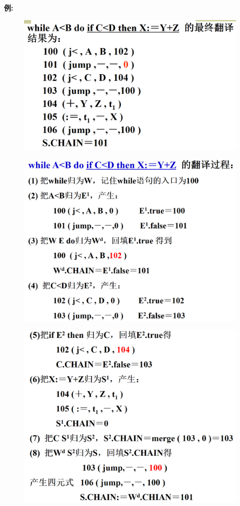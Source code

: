 \documentclass[UTF8,a4paper]{ctexart}
\begin{document}
\textbf{例:}
\begin{figure}[H]
 \centering
 \includegraphics[scale = 0.3]{assets/CompilerConstructionPrinciples_1152a.png}
\end{figure}
\begin{figure}[H]
 \centering
 \includegraphics[scale = 0.3]{assets/CompilerConstructionPrinciples_b905b.png}
\end{figure}
\begin{figure}[H]
 \centering
 \includegraphics[scale = 0.3]{assets/CompilerConstructionPrinciples_8744b.png}
\end{figure}
\end{document}
